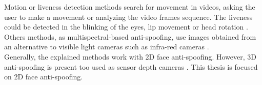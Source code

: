 Motion or liveness detection methods search for movement in videos, asking the user to make a movement or analyzing the video frames sequence. The liveness could be detected in the blinking of the eyes, lip movement or head rotation \cite{distorsion,Spoofing_survey}.\\

Others methods, as multispectral-based anti-spoofing, use images obtained from an alternative to visible light cameras such as infra-red cameras \cite{distorsion}.\\

Generally, the explained methods work with 2D face anti-spoofing.  However, 3D anti-spoofing is present too used as sensor depth cameras \cite{2d_3d_face}. This thesis is focused on 2D face anti-spoofing.\\
